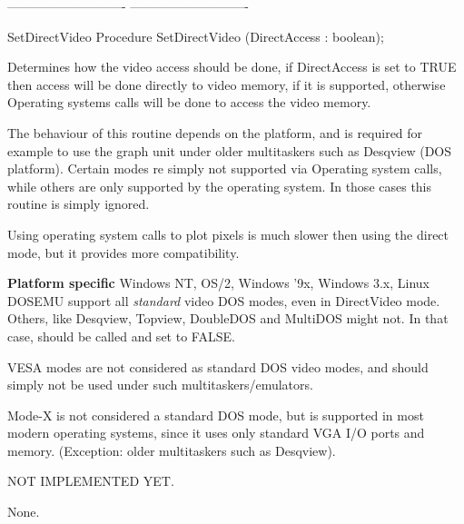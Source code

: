 ----------------------------
----------------------------
\begin{procedure}{SetDirectVideo}
\Declaration
Procedure SetDirectVideo (DirectAccess : boolean);

\Description
Determines how the video access should be done, if DirectAccess
is set to TRUE then access will be done directly to video memory, if
it is supported, otherwise Operating systems calls will be done to
access the video memory.

The behaviour of this routine depends on the platform, and is required
for example to use the graph unit under older multitaskers such as
Desqview (DOS platform). Certain modes re simply not supported
via Operating system calls, while others are only supported by the
operating system. In those cases this routine is simply ignored.

Using operating system calls to plot pixels is much slower then using
the direct mode, but it provides more compatibility.

\textbf{Platform specific}
Windows NT, OS/2, Windows '9x, Windows 3.x, Linux DOSEMU support
all \textit{standard} video DOS modes, even in DirectVideo mode.
Others, like Desqview, Topview, DoubleDOS and MultiDOS might not.
In that case,  should be called and set to FALSE.

VESA modes are not considered as standard DOS video modes,
and should simply not be used under such multitaskers/emulators.

Mode-X is not considered a standard DOS mode, but is supported in
most modern operating systems, since it uses only standard VGA
I/O ports and memory. (Exception: older multitaskers such as Desqview).

NOT IMPLEMENTED YET.


\Errors
None.
\SeeAlso
{}
\end{procedure}

